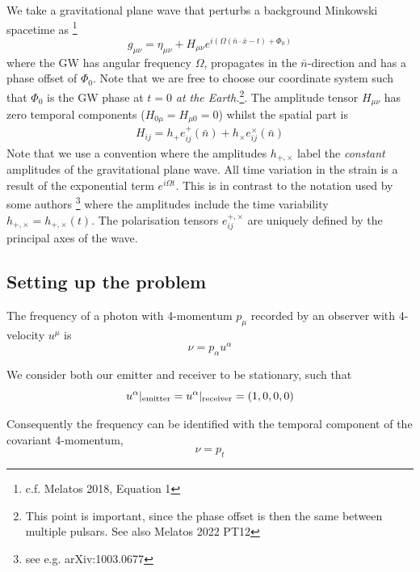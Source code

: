 \documentclass{tufte-handout} %
\begin{document}
\noindent We take a gravitational plane wave that perturbs a background Minkowski spacetime as \footnote{c.f. Melatos 2018, Equation 1}
\begin{equation}
g_{\mu \nu} = \eta_{\mu \nu} + H_{\mu \nu} e^{i(\Omega(\bar{n} \cdot \bar{x} - t) + \Phi_0)	}
\end{equation}
where the GW has angular frequency $\Omega$, propagates in the $\bar{n}$-direction and has a phase offset of  $\Phi_0$. Note that we are free to choose our coordinate system such that $\Phi_0$ is the GW phase at $t=0$ \textit{at the Earth.}\footnote{This point is important, since the phase offset is then the same between multiple pulsars. See also Melatos 2022 PT12}. The amplitude tensor $H_{\mu \nu}$ has zero temporal components ($H_{0 \mu} = H_{\mu 0} = 0$) whilst the spatial part is
\begin{align}
	H_{ij} = h_+ e_{ij}^+(\bar{n}) + h_{\times} e_{ij}^{\times}(\bar{n})
\end{align}
\noindent Note that we use a convention where the amplitudes $h_{+,\times}$ label the \textit{constant} amplitudes of the gravitational plane wave. All time variation in the strain is a result of the exponential term $e^{i\Omega t}$. This is in contrast to the notation used by some authors \footnote{see e.g. arXiv:1003.0677} where the amplitudes include the time variability $h_{+,\times} = h_{+,\times}(t)$. The polarisation tensors $e_{ij}^{+,\times}$ are uniquely defined by the principal axes of the wave. \newline 


\subsection{Setting up the problem}
The frequency of a photon with 4-momentum $p_{\mu}$ recorded by an observer with 4-velocity $u^{\mu}$ is 
\begin{equation}
	\nu = p_{\alpha} u^{\alpha}
\end{equation}


\noindent We consider both our emitter and receiver to be stationary, such that  
\begin{equation}
u^{\alpha}|_{\rm emitter} = u^{\alpha}|_{\rm receiver} = (1,0,0,0)
\end{equation}



\noindent Consequently the frequency can be identified with the temporal component of the covariant 4-momentum,
\begin{equation}
\nu = p_t
\end{equation}
\end{document}
